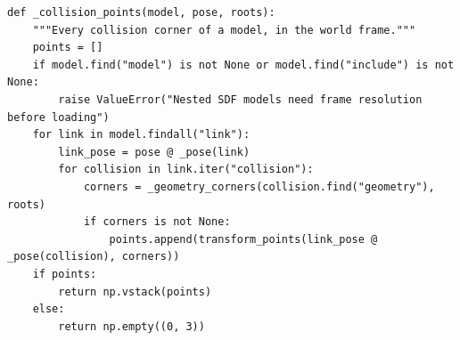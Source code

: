\documentclass[11pt,a4paper]{book}
\begin{document}
\begin{lstlisting}[firstnumber=118]
def _collision_points(model, pose, roots):
    """Every collision corner of a model, in the world frame."""
    points = []
    if model.find("model") is not None or model.find("include") is not None:
        raise ValueError("Nested SDF models need frame resolution before loading")
    for link in model.findall("link"):
        link_pose = pose @ _pose(link)
        for collision in link.iter("collision"):
            corners = _geometry_corners(collision.find("geometry"), roots)
            if corners is not None:
                points.append(transform_points(link_pose @ _pose(collision), corners))
    if points:
        return np.vstack(points)
    else:
        return np.empty((0, 3))


\end{lstlisting}
\end{document}
